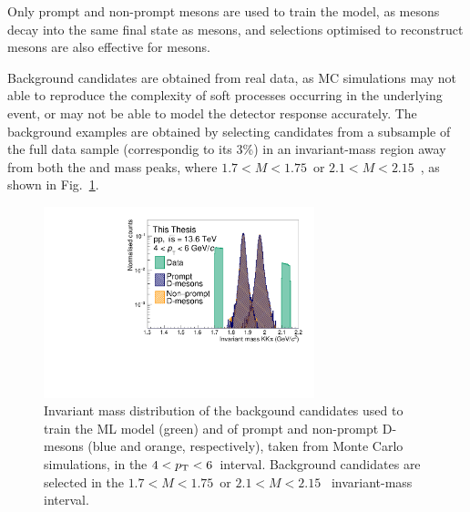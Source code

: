 
Only prompt and non-prompt \ds mesons are used to train the model, as \dpl mesons decay into the same final state as \ds mesons, and selections optimised to reconstruct \ds mesons are also effective for \dpl mesons. 

Background candidates are obtained from real data, as MC simulations may not able to reproduce the complexity of soft processes occurring in the underlying event, or may not be able to model the detector response accurately. The background examples are obtained by selecting candidates from a subsample of the full data sample (correspondig to its 3\%) in an invariant-mass region away from both the \ds and \dpl mass peaks, where $1.7 < M < 1.75$~\gevcc or \mbox{$2.1 < M < 2.15$~\gevcc}, as shown in Fig.~\ref{fig:ml_training_mass}. 

\begin{figure}[htb]
    \centering
    \includegraphics[width=0.7\textwidth]{Figures/Chapter 5/Mass.pdf}
    \caption{Invariant mass distribution of the backgound candidates used to train the ML model (green) and of prompt and non-prompt D-mesons (blue and orange, respectively), taken from Monte Carlo simulations, in the $4<p_\mathrm{T}<6$~\gevc interval. Background candidates are selected in the $1.7 < M < 1.75$~\gevcc or \mbox{$2.1 < M < 2.15$~\gevcc} invariant-mass interval.}
    \label{fig:ml_training_mass}
\end{figure}

